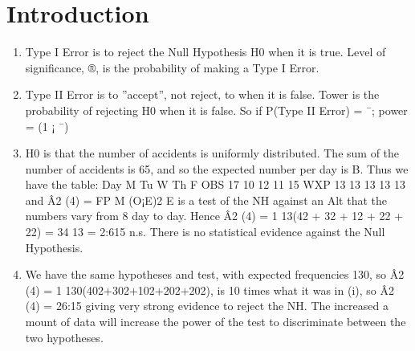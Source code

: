 \documentclass[a4paper,12pt]{article}
\begin{document}
\section{Introduction}
\begin{enumerate}
    \item  Type I Error is to reject the Null Hypothesis H0 when it is true. Level of significance,
®, is the probability of making a Type I Error.
\item Type II Error is to ”accept”, not reject, to when it is false. Tower is the probability
of rejecting H0 when it is false. So if P(Type II Error) = ¯; power = (1 ¡ ¯)
\item  H0 is that the number of accidents is uniformly distributed. The sum of the number
of accidents is 65, and so the expected number per day is B. Thus we have the table:
Day M Tu W Th F
OBS 17 10 12 11 15
WXP 13 13 13 13 13
and Â2
(4) =
FP
M
(O¡E)2
E is a test of the NH against an Alt that the numbers vary from
8
day to day. Hence Â2
(4) = 1
13(42 + 32 + 12 + 22 + 22) = 34
13 = 2:615 n.s. There is no
statistical evidence against the Null Hypothesis.
\item  We have the same hypotheses and test, with expected frequencies 130, so Â2
(4) =
1
130(402+302+102+202+202), is 10 times what it was in (i), so Â2
(4) = 26:15 giving
very strong evidence to reject the NH. The increased a mount of data will increase
the power of the test to discriminate between the two hypotheses.
\end{enumerate}
\end{document}
